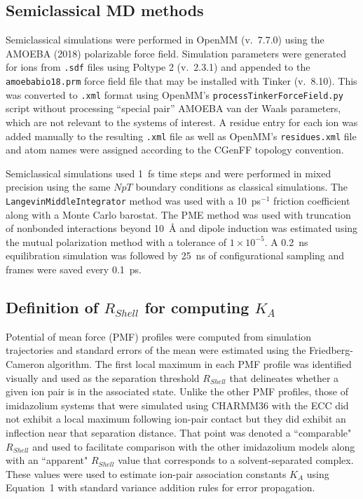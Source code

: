\documentclass[journal=jacsat,articletitle=true,manuscript=suppinfo,layout=onecolumn]{achemso}
\begin{document}
    \subsection{Semiclassical MD methods}
    Semiclassical simulations were performed in OpenMM (v.\ 7.7.0) \cite{Eastman2017} using the AMOEBA (2018) polarizable force field. \cite{Shi2013} Simulation parameters were generated for ions from \texttt{.sdf} files using Poltype 2 (v.\ 2.3.1) \cite{Walker2022} and appended to the \texttt{amoebabio18.prm} force field file that may be installed with Tinker (v.\ 8.10). \cite{Rackers2018} This was converted to \texttt{.xml} format using OpenMM's  \texttt{processTinkerForceField.py} script without processing ``special pair'' AMOEBA van der Waals parameters, which are not relevant to the systems of interest. A residue entry for each ion was added manually to the resulting \texttt{.xml} file as well as OpenMM's \texttt{residues.xml} file and atom names were assigned according to the CGenFF topology convention. 

    Semiclassical simulations used 1~fs time steps and were performed in mixed precision using the same $NpT$ boundary conditions as classical simulations. The \texttt{LangevinMiddleIntegrator} method was used with a 10~ps$^{-1}$ friction coefficient along with a Monte Carlo barostat. The PME method was used with truncation of nonbonded interactions beyond 10~{\AA} and dipole induction was estimated using the mutual polarization method with a tolerance of $1 \times 10^{-5}$. A 0.2~ns equilibration simulation was followed by 25~ns of configurational sampling and frames were saved every 0.1~ps.


    \subsection{Definition of $R_{Shell}$ for computing $K_A$}
    Potential of mean force (PMF) profiles were computed from simulation trajectories and standard errors of the mean were estimated using the Friedberg-Cameron algorithm.\cite{Friedberg1970, Allen1986} The first local maximum in each PMF profile was identified visually and used as the separation threshold $R_{Shell}$ that delineates whether a given ion pair is in the associated state. Unlike the other PMF profiles, those of imidazolium systems that were simulated using CHARMM36 with the ECC did not exhibit a local maximum following ion-pair contact but they did exhibit an inflection near that separation distance. That point was denoted a ``comparable" $R_{Shell}$ and used to facilitate comparison with the other imidazolium models along with an ``apparent" $R_{Shell}$ value that corresponds to a solvent-separated complex. These values were used to estimate ion-pair association constants $K_{A}$ using Equation~1
    with standard variance addition rules for error propagation. 
\end{document}
